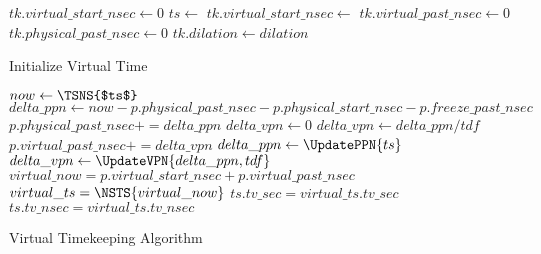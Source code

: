 \begin{algorithm}[ht]
    \DontPrintSemicolon
     {
         {
            $tk.virtual\_start\_nsec \gets 0$ \;
            $ts \gets$ \GetNS{} \;
            $tk.virtual\_start\_nsec \gets$  \;
            $tk.virtual\_past\_nsec \gets 0$ \;
            $tk.physical\_past\_nsec \gets 0$ \;
            $tk.dilation \gets dilation$
        }
    }
    \caption{Initialize Virtual Time}
    \label{VT:Alg:InitVirtualTime}
\end{algorithm}

\begin{algorithm}[ht]
    \DontPrintSemicolon
     {
        $now \gets \TSNS{$ts$}$ \;
        $delta\_ppn \gets now - p.physical\_past\_nsec - p.physical\_start\_nsec - p.freeze\_past\_nsec$ \;
        $p.physical\_past\_nsec += delta\_ppn$ \;
         \;
    }
     {
        $delta\_vpn \gets 0$ \;
         {
            $delta\_vpn \gets delta\_ppn / tdf$ \;
            $p.virtual\_past\_nsec += delta\_vpn$ \;
        }
    }
     {
         {
            $delta\_ppn \gets \UpdatePPN{ts}$ \;
            $delta\_vpn \gets \UpdateVPN{delta\_ppn, tdf}$ \;
            $virtual\_now = p.virtual\_start\_nsec + p.virtual\_past\_nsec$ \;
            $virtual\_ts = \NSTS{virtual\_now}$ \; 
            $ts.tv\_sec = virtual\_ts.tv\_sec$ \;
            $ts.tv\_nsec = virtual\_ts.tv\_nsec$ \;
        }
    }
    \caption{Virtual Timekeeping Algorithm}
    \label{VT:Alg:VirtualTimeKeeping}
\end{algorithm}

